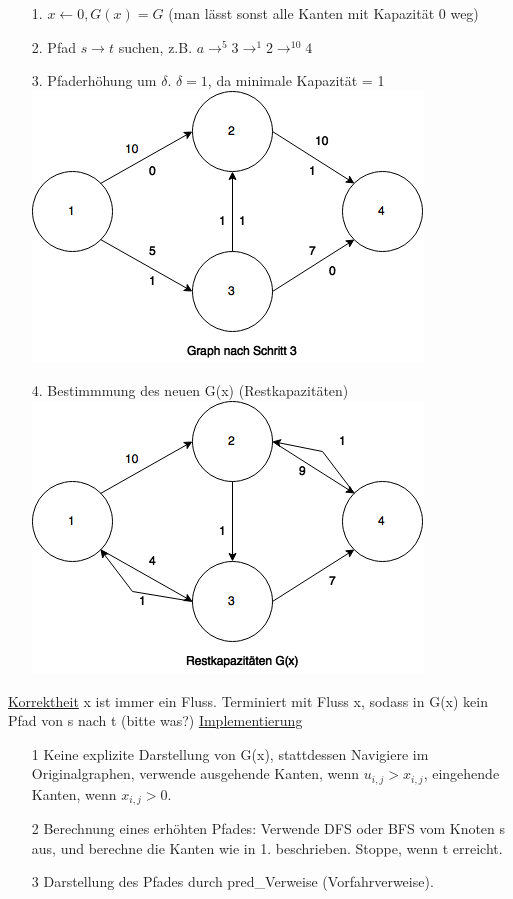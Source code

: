 \documentclass[a4paper]{article}
\begin{document}
\begin{itemize}
\item[1.] $x\leftarrow 0, G(x)=G$ (man lässt sonst alle Kanten mit Kapazität 0 weg)
\item[2.] Pfad $s\rightarrow t$ suchen, z.B. $a\rightarrow^5 3 \rightarrow^1 2 \rightarrow^{10} 4$
\item[3.] Pfaderhöhung um $\delta$. $\delta = 1$, da minimale Kapazität = 1\\ \includegraphics[scale=0.3]{AE10-2.png}
\item[4.] Bestimmmung des neuen G(x) (Restkapazitäten)\\ \includegraphics[scale=0.3]{AE10-3.png}
\end{itemize}
\underline{Korrektheit} x ist immer ein Fluss. Terminiert mit Fluss x, sodass in G(x) kein Pfad von s nach t (bitte was?)
\underline{Implementierung} 
\begin{itemize}
\item[1] Keine explizite Darstellung von G(x), stattdessen Navigiere im Originalgraphen, verwende ausgehende Kanten, wenn $u_{i,j} > x_{i,j}$, eingehende Kanten, wenn $x_{i,j} > 0$.
\item[2] Berechnung eines erhöhten Pfades: Verwende DFS oder BFS vom Knoten s aus, und berechne die Kanten wie in 1. beschrieben. Stoppe, wenn t erreicht.
\item[3] Darstellung des Pfades durch pred\_Verweise (Vorfahrverweise).
\end{itemize} 
\end{document}
